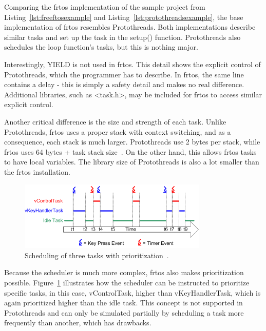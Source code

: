 Comparing the \gls{frtos} implementation of the sample project from Listing~\ref{lst:freeftosexample} and Listing~\ref{lst:protothreadsexample}, the base implementation of \gls{frtos} resembles Protothreads. Both implementations describe similar tasks and set up the task in the setup() function. Protothreads also schedules the loop function's tasks, but this is nothing major.

Interestingly, YIELD is not used in \gls{frtos}. This detail shows the explicit control of Protothreads, which the programmer has to describe. In \gls{frtos}, the same line contains a delay - this is simply a safety detail and makes no real difference. Additional libraries, such as <task.h>, may be included for \gls{frtos} to access similar explicit control.

Another critical difference is the size and strength of each task. Unlike Protothreads, \gls{frtos} uses a proper stack with context switching, and as a consequence, each stack is much larger. Protothreads use 2 bytes per stack, while \gls{frtos} uses 64 bytes + task stack size~\cite{AboutRTOS}. On the other hand, this allows \gls{frtos} tasks to have local variables. The library size of Protothreads is also a lot smaller than the \gls{frtos} installation.


\begin{figure}[htbp]
  \centering
  \includegraphics[width=0.8\textwidth]{figures/FreeRTOS_Prioritization.png}
  \caption{Scheduling of three tasks with prioritization~\cite{SchedulingRTOS}.}
  \label{fig:freertosprio}
\end{figure}


Because the scheduler is much more complex, \gls{frtos} also makes prioritization possible. Figure~\ref{fig:freertosprio} illustrates how the scheduler can be instructed to prioritize specific tasks, in this case, vControlTask, higher than vKeyHandlerTask, which is again prioritized higher than the idle task. This concept is not supported in Protothreads and can only be simulated partially by scheduling a task more frequently than another, which has drawbacks.


